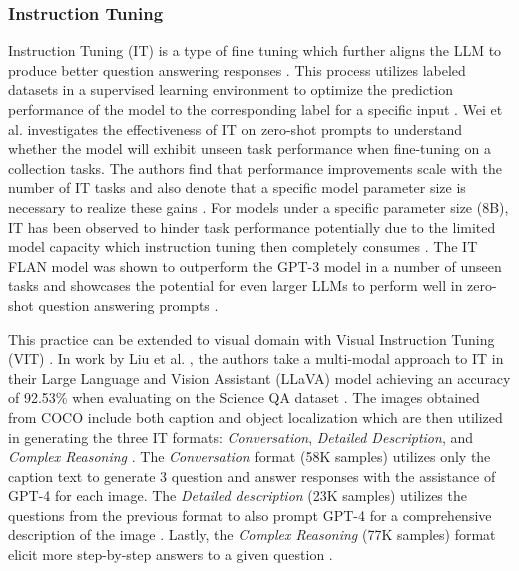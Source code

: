 \subsubsection{Instruction Tuning}
\label{sec:it}

Instruction Tuning (IT) is a type of fine tuning which further aligns the LLM to
produce better question answering responses \cite{wei_finetuned_2021,
liu_visual_2023}. This process utilizes labeled datasets in a supervised
learning environment to optimize the prediction performance of the model to the
corresponding label for a specific input \cite{wei_finetuned_2021,
liu_visual_2023}. Wei et al. \cite{wei_finetuned_2021} investigates the
effectiveness of IT on zero-shot prompts to understand whether the model will
exhibit unseen task performance when fine-tuning on a collection tasks. The
authors find that performance improvements scale with the number of IT tasks and
also denote that a specific model parameter size is necessary to realize these
gains \cite{wei_finetuned_2021}. For models under a specific parameter size
(8B), IT has been observed to hinder task performance potentially due to the
limited model capacity which instruction tuning then completely consumes
\cite{wei_finetuned_2021}. The IT FLAN model was shown to outperform the GPT-3
model in a number of unseen tasks and showcases the potential for even larger
LLMs to perform well in zero-shot question answering prompts
\cite{wei_finetuned_2021}.

This practice can be extended to visual domain with Visual Instruction Tuning
(VIT) \cite{liu_visual_2023}. In work by Liu et al. \cite{liu_visual_2023}, the
authors take a multi-modal approach to IT in their Large Language and Vision
Assistant (LLaVA) model achieving an accuracy of 92.53\% when evaluating on the
Science QA dataset \cite{lu_learn_2022}. The images obtained
\cite{lin_microsoft_2015} from COCO include both caption and object localization
which are then utilized in generating the three IT formats:
\textit{Conversation}, \textit{Detailed Description}, and \textit{Complex
Reasoning} \cite{liu_visual_2023}. The \textit{Conversation} format (58K
samples) utilizes only the caption text to generate 3 question and answer
responses with the assistance of GPT-4 for each image. The \textit{Detailed
description} (23K samples) utilizes the questions from the previous format to
also prompt GPT-4 for a comprehensive description of the image
\cite{liu_visual_2023}. Lastly, the \textit{Complex Reasoning} (77K samples)
format elicit more step-by-step answers to a given question
\cite{liu_visual_2023}.

